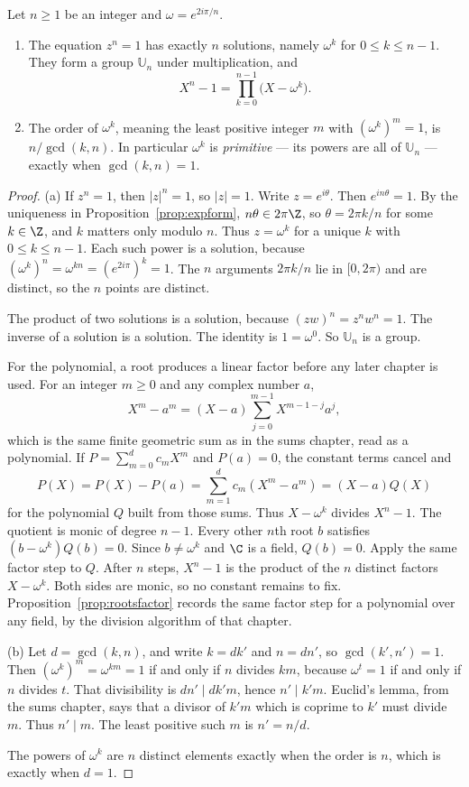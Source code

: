 \begin{proposition}\label{prop:roots}
Let $n\ge1$ be an integer and $\omega=e^{2i\pi/n}$.
\begin{enumerate}[label=(\alph*)]
\item The equation $z^n=1$ has exactly $n$ solutions, namely $\omega^k$ for $0\le k\le n-1$. They form a group $\mathbb U_n$ under multiplication, and
\[
X^n-1=\prod_{k=0}^{n-1}\bigl(X-\omega^k\bigr).
\]
\item The order of $\omega^k$, meaning the least positive integer $m$ with $(\omega^k)^m=1$, is $n/\gcd(k,n)$. In particular $\omega^k$ is \emph{primitive} --- its powers are all of $\mathbb U_n$ --- exactly when $\gcd(k,n)=1$.
\end{enumerate}
\end{proposition}
\begin{proof}
(a) If $z^n=1$, then $|z|^n=1$, so $|z|=1$. Write $z=e^{i\theta}$. Then $e^{in\theta}=1$. By the uniqueness in Proposition~\ref{prop:expform}, $n\theta\in2\pi\Z$, so $\theta=2\pi k/n$ for some $k\in\Z$, and $k$ matters only modulo $n$. Thus $z=\omega^k$ for a unique $k$ with $0\le k\le n-1$. Each such power is a solution, because $(\omega^k)^n=\omega^{kn}=(e^{2i\pi})^k=1$. The $n$ arguments $2\pi k/n$ lie in $[0,2\pi)$ and are distinct, so the $n$ points are distinct.

The product of two solutions is a solution, because $(zw)^n=z^nw^n=1$. The inverse of a solution is a solution. The identity is $1=\omega^0$. So $\mathbb U_n$ is a group.

For the polynomial, a root produces a linear factor before any later chapter is used. For an integer $m\ge 0$ and any complex number $a$,
\[
X^m-a^m=(X-a)\sum_{j=0}^{m-1}X^{m-1-j}a^j,
\]
which is the same finite geometric sum as in the sums chapter, read as a polynomial. If $P=\sum_{m=0}^d c_m X^m$ and $P(a)=0$, the constant terms cancel and
\[
P(X)=P(X)-P(a)=\sum_{m=1}^d c_m(X^m-a^m)=(X-a)Q(X)
\]
for the polynomial $Q$ built from those sums. Thus $X-\omega^k$ divides $X^n-1$. The quotient is monic of degree $n-1$. Every other $n$th root $b$ satisfies $(b-\omega^k)Q(b)=0$. Since $b\ne\omega^k$ and $\C$ is a field, $Q(b)=0$. Apply the same factor step to $Q$. After $n$ steps, $X^n-1$ is the product of the $n$ distinct factors $X-\omega^k$. Both sides are monic, so no constant remains to fix. Proposition~\ref{prop:rootsfactor} records the same factor step for a polynomial over any field, by the division algorithm of that chapter.

(b) Let $d=\gcd(k,n)$, and write $k=dk'$ and $n=dn'$, so $\gcd(k',n')=1$. Then $(\omega^k)^m=\omega^{km}=1$ if and only if $n$ divides $km$, because $\omega^t=1$ if and only if $n$ divides $t$. That divisibility is $dn'\mid dk'm$, hence $n'\mid k'm$. Euclid's lemma, from the sums chapter, says that a divisor of $k'm$ which is coprime to $k'$ must divide $m$. Thus $n'\mid m$. The least positive such $m$ is $n'=n/d$.

The powers of $\omega^k$ are $n$ distinct elements exactly when the order is $n$, which is exactly when $d=1$.
\end{proof}

